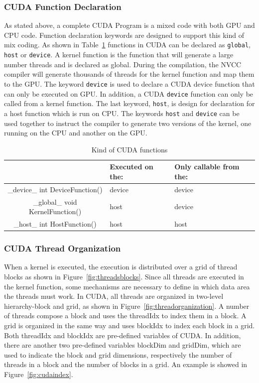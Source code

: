 \documentclass[Ingles]{ic-tese-v1}
\newcommand{\rfig}[1]{Figure~\ref{fig:#1}}
\newcommand{\ttt}[1]{{\texttt{#1}}}
\begin{document}
\subsubsection{CUDA Function Declaration}
\label{CUDAfunction}

As stated above, a complete CUDA Program is a mixed code with both GPU and CPU
code. Function declaration keywords are designed to support this kind of mix
coding. As shown in Table~\ref{tab:cudaFunction} functions in CUDA can be
declared as \ttt{global}, \ttt{host} or \ttt{device}. A kernel function is the function that will
generate a large number threads and is declared as global. During the
compilation, the NVCC compiler will generate thousands of threads for the
kernel function and map them to the GPU. The keyword \ttt{device} is used to declare
a CUDA device function that can only be executed on GPU. In addition, a CUDA
\ttt{device} function can only be called from a kernel function. The last keyword,
\ttt{host}, is design for declaration for a host function which is run on CPU. The
keywords \ttt{host} and \ttt{device} can be used  together to instruct the compiler to
generate two versions of the kernel, one running on the CPU and another on the
GPU.

\begin{table}[!t]
	\caption[small]{Kind of CUDA functions}
\begin{center}
	\begin{tabular}{ | c | >{\centering\arraybackslash}p{2cm} | >{\centering\arraybackslash}p{3cm} |}
		\hline
		 & Executed on the: & Only callable from the: \\ \hline
		{\color{blue} \_device\_} int DeviceFunction() & device & device \\ \hline
		{\color{blue} \_global\_} void KernelFunction()& host & device \\ \hline
		{\color{blue} \_host\_} int HostFunction() & host & host\\
		\hline
	\end{tabular}
\end{center}
\label{tab:cudaFunction}
\end{table}

\subsubsection{CUDA Thread Organization}
\label{CUDA Thread Organization}
When a kernel is executed, the execution is distributed over a grid of thread
blocks as shown in \rfig{threadsblocks}. Since all threads are executed in the
kernel function, some mechanisms are necessary to define in which data area the
threads must work. In CUDA, all threads are organized in two-level
hierarchy-block and grid, as shown in \rfig{threadorganization}. A number of
threads compose a block and uses the threadIdx to index them in a block. A grid
is organized in the same way and uses blockIdx to index each block in a grid.
Both threadIdx and blockIdx are pre-defined variables of CUDA. In addition,
there are another two pre-defined variables blockDim and gridDim, which are
used to indicate the block and grid dimensions, respectively the number of threads in a block
and the number of blocks in a grid. An example is showed in \rfig{cudaindex}.
\end{document}
